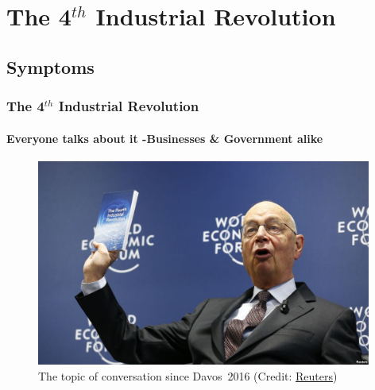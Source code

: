 % 
\section{The 4$^{th}$ Industrial Revolution}
\subsection{Symptoms}
\begin{frame}
	\frametitle{The 4$^{th}$ Industrial Revolution}
	\framesubtitle{Everyone talks about it -Businesses \& Government alike}
	\begin{figure}
		\includegraphics[width=11cm]{../pics/Schwab-4th-revolution-book-cover}
		\caption{The topic of conversation since Davos~2016 (Credit: \href{http://www.voanews.com/a/wef-founder-world-unprepared-to-deal-with-fourth-industrial-revolution/3143406.html}{Reuters})}
	\end{figure}
\end{frame}


